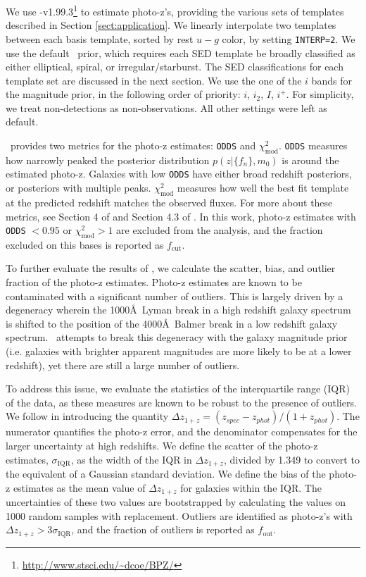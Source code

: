 We use \bpz-v1.99.3\footnote{\url{http://www.stsci.edu/~dcoe/BPZ/}} \citep{Benitez2000a} to estimate photo-z's, providing the various sets of templates described in Section \ref{sect:application}.
We linearly interpolate two templates between each basis template, sorted by rest $u-g$ color, by setting \texttt{INTERP=2}. 
We use the default \bpz\ prior, which requires each SED template be broadly classified as either elliptical, spiral, or irregular/starburst. 
The SED classifications for each template set are discussed in the next section. 
We use the one of the $i$ bands for the magnitude prior, in the following order of priority: $i$, $i_2$, $I$, $i^+$.
For simplicity, we treat non-detections as non-observations.
All other settings were left as default.

\bpz\ provides two metrics for the photo-z estimates: \texttt{ODDS} and $\chi_{\text{mod}}^2$.
\texttt{ODDS} measures how narrowly peaked the posterior distribution $p(z|\{f_n\},m_0)$ is around the estimated photo-z.
Galaxies with low \texttt{ODDS} have either broad redshift posteriors, or posteriors with multiple peaks.
$\chi_{\text{mod}}^2$ measures how well the best fit template at the predicted redshift matches the observed fluxes. 
For more about these metrics, see Section 4 of \citet{Benitez2000a} and Section 4.3 of \citet{Coe2006a}.
In this work, photo-z estimates with \texttt{ODDS} $< 0.95$ or $\chi_{\text{mod}}^2 > 1$ are excluded from the analysis, and the fraction excluded on this bases is reported as $f_\text{cut}$.

To further evaluate the results of \bpz, we calculate the scatter, bias, and outlier fraction of the photo-z estimates. 
Photo-z estimates are known to be contaminated with a significant number of outliers.
This is largely driven by a degeneracy wherein the 1000\AA\ Lyman break in a high redshift galaxy spectrum is shifted to the position of the 4000\AA\ Balmer break in a low redshift galaxy spectrum. 
\bpz\ attempts to break this degeneracy with the galaxy magnitude prior (i.e. galaxies with brighter apparent magnitudes are more likely to be at a lower redshift), yet there are still a large number of outliers.

To address this issue, we evaluate the statistics of the interquartile range (IQR) of the data, as these measures are known to be robust to the presence of outliers.
We follow \citet{Graham2018a} in introducing the quantity $\Delta z_{1+z} = (z_{spec} - z_{phot})/(1 + z_{phot})$.
The numerator quantifies the photo-z error, and the denominator compensates for the larger uncertainty at high redshifts. 
We define the scatter of the photo-z estimates, $\sigma_\text{IQR}$,  as the width of the IQR in $\Delta z_{1+z}$, divided by 1.349 to convert to the equivalent of a Gaussian standard deviation. 
We define the bias of the photo-z estimates as the mean value of $\Delta z_{1+z}$ for galaxies within the IQR.
The uncertainties of these two values are bootstrapped by calculating the values on 1000 random samples with replacement. 
Outliers are identified as photo-z's with $\Delta z_{1+z} > 3 \sigma_{\text{IQR}}$, and the fraction of outliers is reported as $f_\text{out}$.



